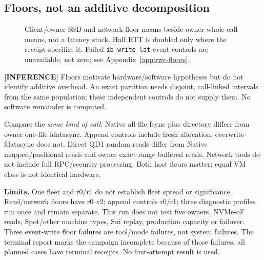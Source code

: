\clearpage
\subsection{Floors, not an additive decomposition}
\begin{figure}[H]\centering{}
\caption{Client/owner SSD and network floor means beside owner whole-call means, not a latency stack. Half RTT is doubled only where the receipt specifies it. Failed \texttt{ib\_write\_lat} event controls are unavailable, not zero; see Appendix~\ref{app:rwc-floors}.}
\end{figure}
\textbf{[INFERENCE]} Floors motivate hardware/software hypotheses but do not identify additive overhead. An exact partition needs disjoint, call-linked intervals from the same population; these independent controls do not supply them. No software remainder is computed.

Compare the \emph{same kind of call}: Native all-file fsync plus directory differs from owner one-file fdatasync. Append controls include fresh allocation; overwrite-fdatasync does not. Direct QD1 random reads differ from Native mapped/positional reads and owner exact-range buffered reads. Network tools do not include full RPC/security processing. Both host floors matter; equal VM class is not identical hardware.

\textbf{Limits.} One fleet and r0/r1 do not establish fleet spread or significance. Read/network floors have r0--r2; append controls r0/r1; three diagnostic profiles run once and remain separate. This run does not test five owners, NVMe-oF reads, Spot/other machine types, Sui replay, production capacity or failover. Three event-write floor failures are tool/mode failures, not system failures. The terminal report marks the campaign incomplete because of those failures; all planned cases have terminal receipts. No first-attempt result is used.
